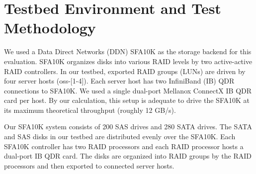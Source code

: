 \section{Testbed Environment and Test Methodology}
\label{sec:testbed}

We used a Data Direct Networks (DDN) SFA10K as the storage backend for this
evaluation. SFA10K organizes disks into various RAID levels by two
active-active RAID controllers. In our testbed, exported RAID groups (LUNs) 
are driven by four server hosts (oss-[1-4]).  Each server host has
two InfiniBand (IB) QDR connections to SFA10K.  We used a single
dual-port Mellanox ConnectX IB QDR card per host.  By our calculation, this
setup is adequate to drive the SFA10K at its maximum theoretical throughput
(roughly 12 GB/s). 

Our SFA10K system consists of 200 SAS drives and 280 SATA drives.
The SATA and SAS disks in our
testbed are distributed evenly over the SFA10K.
Each SFA10K controller has two RAID processors and each
RAID processor hosts a dual-port IB QDR card. The disks are organized into RAID
groups by the RAID processors and then exported to connected
server hosts.

